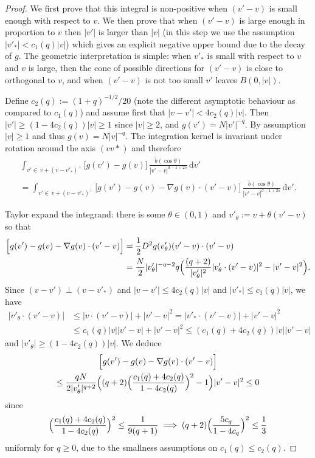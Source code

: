 \documentclass[11pt]{article}
\theoremstyle{plain}
\theoremstyle{definition}
\numberwithin{equation}{section}
\newcommand{\dd} {\, \mathrm{d}}
\let\A N
\begin{document}
\begin{proof}
We first prove that this integral is non-positive when $(v'-v)$ is
small enough with respect to $v$. We then prove that when $(v'-v)$
is large enough in proportion to $v$ then $|v'|$ is larger than
$|v|$ (in this step we use the assumption $|v'_*| < c_1(q) |v|$) which
gives an explicit negative upper bound due to the decay of $g$. The
geometric interpretation is simple: when $v'_*$ is small with
respect to $v$ and $v$ is large, then the cone of possible
directions for $(v'-v)$ is close to orthogonal to $v$, and when
$(v'-v)$ is not too small $v'$ leaves $B(0,|v|)$.

Define $c_2(q) := (1+q)^{-1/2}/20$ (note the different asymptotic
behaviour as compared to $c_1(q)$) and assume first that
$|v-v'| < 4 c_2(q) |v|$. Then $|v'| \ge (1-4c_2(q))|v| \ge 1$ since
$|v| \ge 2$, and $g(v') = N |v'|^{-q}$. By assumption $|v| \ge 1$
and thus $g(v) = N |v|^{-q}$. The integration kernel is invariant
under rotation around the axis $(vv*)$ and therefore
\begin{multline*}
\int_{v'\in \, v + (v-v'_*)^\bot} \big[ g(v') - g(v)\big]\, \frac{\tilde
b(\cos \theta)}{|v'-v|^{d-1+2s}} \dd v' \\ =
\int_{v'\in \, v + (v-v'_*)^\bot} \Big[ g(v') - g(v) - \nabla g(v)
\cdot (v'-v) \Big]\, \frac{\tilde
b(\cos \theta)}{|v'-v|^{d-1+2s}} \dd v'.
\end{multline*}

Taylor expand the integrand: there is some $\theta \in (0,1)$ and
$v'_\theta := v + \theta(v'-v)$ so that
\begin{align}
\nonumber
\Big[ g(v')-g(v) - \nabla g (v) \cdot (v'-v) \Big]
&= \frac12 D^2 g (v'_\theta) (v'-v)\cdot (v'-v) \\
\label{eq:taylor}
& = \frac{\A}{2} |v'_\theta |^{-q-2} q
\Bigl(\frac{(q+2)}{|v'_\theta|^2} |v'_\theta \cdot (v'-v)|^2 - |v'-v|^2 \Bigr).
\end{align}
Since $(v-v') \perp (v-v'_*)$ and $|v-v'| \le 4 c_2(q) |v|$ and $|v'_*|\le c_1(q) |v|$, we have
\begin{align*}
|v'_\theta \cdot (v'-v)| & \le |v\cdot (v'-v)| + |v'-v|^2 = |v'_*
\cdot (v'-v)| + |v'-v|^2 \\ & \le c_1(q) |v||v'-v| + |v'-v|^2 \le
\left( c_1(q) + 4 c_2(q) \right) |v| |v'-v|
\end{align*}
and $|v'_\theta| \geq (1-4c_2(q)) |v|$. We deduce
\begin{multline} \label{e:small z}
\Big[ g(v')-g(v) - \nabla g (v) \cdot (v'-v) \Big]\\
\le \frac{q
\A}{2|v'_\theta |^{q+2}}
\Bigl((q+2)\Bigl(\frac{c_1(q) + 4 c_2(q)}{1-4c_2(q)}\Bigr)^2-1 \Bigr)|v'-v|^2 \le 0
\end{multline}
since
\[
\Bigl(\frac{c_1(q)+4c_2(q)}{1-4c_2(q)}\Bigr)^2 \le \frac{1}{9(q+1)} \implies (q+2) \Bigl(\frac{5c_q}{1-4c_q}\Bigr)^2 \le \frac{1}{3}
\]
uniformly for $q \ge 0$, due to the smallness assumptions on
$c_1(q) \le c_2(q)$.


\end{proof}
\end{document}
